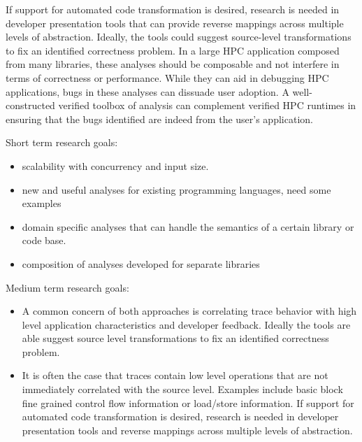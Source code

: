 If support for automated code transformation is desired, research is needed in developer presentation tools that can provide reverse mappings across multiple levels of abstraction. Ideally, the tools could suggest source-level transformations to fix an identified correctness problem. In a large HPC application composed from many libraries, these analyses should be composable and not interfere in terms of correctness or performance. While they can aid in debugging HPC applications, bugs in these analyses can dissuade user adoption. A well-constructed verified toolbox of analysis can complement verified HPC runtimes in ensuring that the bugs identified are indeed from the user's application.

 
Short term research goals:
 \begin{itemize}
 \item scalability with concurrency and input size.
 \item new and useful analyses for existing  programming languages, need some examples
 \item domain specific analyses that  can  handle the semantics of a  certain library or code base.
 \item composition of analyses developed for  separate libraries
 \end{itemize}
 
 
 Medium  term research goals:
 \begin{itemize}
 \item A common concern of both approaches is correlating trace behavior with high level application characteristics and developer feedback. Ideally the tools are able suggest source level transformations to fix an identified correctness problem. 
 \item It is often the case that traces contain low level operations that are not immediately correlated with the source level. Examples include basic block fine grained control flow information or load/store information. If support for automated code transformation is desired, research is needed in developer presentation tools and reverse mappings across multiple levels of abstraction.
 \end{itemize}

